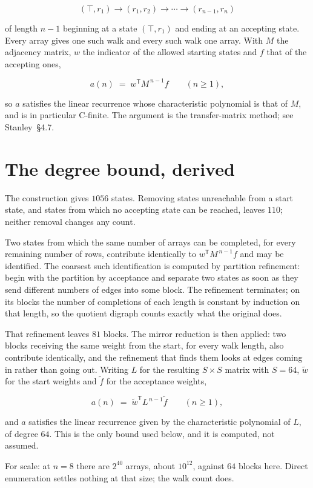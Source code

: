 \documentclass[11pt]{article}
\theoremstyle{definition}
\begin{document}
\[(\top,r_1) \to (r_1,r_2) \to \cdots \to (r_{n-1},r_n)\]

of length $n-1$ beginning at a state $(\top,r_1)$ and ending at an accepting state. Every array gives one such walk and every such walk one array. With $M$ the adjacency matrix, $w$ the indicator of the allowed starting states and $f$ that of the accepting ones,

\[a(n) \;=\; w^{\mathsf T} M^{\,n-1} f \qquad (n \ge 1),\]

so $a$ satisfies the linear recurrence whose characteristic polynomial is that of $M$, and is in particular C-finite. The argument is the transfer-matrix method; see Stanley~\S4.7.

\section{The degree bound, derived}

The construction gives $1056$ states. Removing states unreachable from a start state, and states from which no accepting state can be reached, leaves $110$; neither removal changes any count.

Two states from which the same number of arrays can be completed, for every remaining number of rows, contribute identically to $w^{\mathsf T}M^{\,n-1}f$ and may be identified. The coarsest such identification is computed by partition refinement: begin with the partition by acceptance and separate two states as soon as they send different numbers of edges into some block. The refinement terminates; on its blocks the number of completions of each length is constant by induction on that length, so the quotient digraph counts exactly what the original does.

That refinement leaves $81$ blocks. The mirror reduction is then applied: two blocks receiving the same weight from the start, for every walk length, also contribute identically, and the refinement that finds them looks at edges coming in rather than going out. Writing $L$ for the resulting $S \times S$ matrix with $S = 64$, $\tilde w$ for the start weights and $\tilde f$ for the acceptance weights,

\[a(n) \;=\; \tilde w^{\mathsf T} L^{\,n-1} \tilde f \qquad (n \ge 1),\]

and $a$ satisfies the linear recurrence given by the characteristic polynomial of $L$, of degree $64$. This is the only bound used below, and it is computed, not assumed.

For scale: at $n = 8$ there are $2^{40}$ arrays, about $10^{12}$, against $64$ blocks here. Direct enumeration settles nothing at that size; the walk count does.
\end{document}

